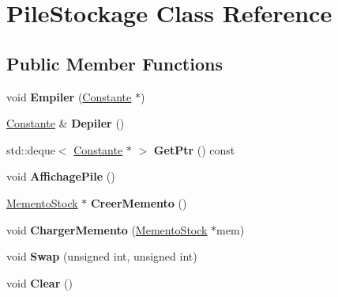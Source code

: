 \hypertarget{class_pile_stockage}{\section{Pile\-Stockage Class Reference}
\label{class_pile_stockage}
}
\subsection*{Public Member Functions}
\begin{DoxyCompactItemize}
\item 
\hypertarget{class_pile_stockage_abab257876447da78f207a37157f6d3c8}{void {\bfseries Empiler} (\hyperlink{class_constante}{Constante} $\ast$)}\label{class_pile_stockage_abab257876447da78f207a37157f6d3c8}

\item 
\hypertarget{class_pile_stockage_a042c00dd20322ab9c88fcc403ee3af1f}{\hyperlink{class_constante}{Constante} \& {\bfseries Depiler} ()}\label{class_pile_stockage_a042c00dd20322ab9c88fcc403ee3af1f}

\item 
\hypertarget{class_pile_stockage_aa95f27fc7ae06630b58db52faf6316f8}{std\-::deque$<$ \hyperlink{class_constante}{Constante} $\ast$ $>$ {\bfseries Get\-Ptr} () const }\label{class_pile_stockage_aa95f27fc7ae06630b58db52faf6316f8}

\item 
\hypertarget{class_pile_stockage_a27319570899f25a4f0e1f7408ced9127}{void {\bfseries Affichage\-Pile} ()}\label{class_pile_stockage_a27319570899f25a4f0e1f7408ced9127}

\item 
\hypertarget{class_pile_stockage_af558173619e4a4859f740808616a741b}{\hyperlink{class_memento_stock}{Memento\-Stock} $\ast$ {\bfseries Creer\-Memento} ()}\label{class_pile_stockage_af558173619e4a4859f740808616a741b}

\item 
\hypertarget{class_pile_stockage_ab545906e2168095847357f3cbd6c9481}{void {\bfseries Charger\-Memento} (\hyperlink{class_memento_stock}{Memento\-Stock} $\ast$mem)}\label{class_pile_stockage_ab545906e2168095847357f3cbd6c9481}

\item 
\hypertarget{class_pile_stockage_a8e3387a172e0544ecb8e3415da82ef8a}{void {\bfseries Swap} (unsigned int, unsigned int)}\label{class_pile_stockage_a8e3387a172e0544ecb8e3415da82ef8a}

\item 
\hypertarget{class_pile_stockage_a87982d39f9ff25627c7c2ffdb6105048}{void {\bfseries Clear} ()}\label{class_pile_stockage_a87982d39f9ff25627c7c2ffdb6105048}


\end{DoxyCompactItemize}
